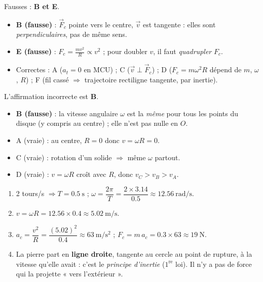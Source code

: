 \documentclass[11pt,a4paper]{article}
\newcommand{\vv}[1]{\vec{#1}}\newcommand{\ds}{\displaystyle}
\begin{document}

\begin{corrige}
Fausses : \textbf{B et E}.
\begin{itemize}[leftmargin=1.4em,topsep=2pt,itemsep=1.5pt]
  \item \textbf{B (fausse)} : $\vv F_c$ pointe vers le centre, $\vv v$ est tangente : elles sont \emph{perpendiculaires}, pas de même sens.
  \item \textbf{E (fausse)} : $F_c=\tfrac{mv^2}{R}\propto v^2$ ; pour doubler $v$, il faut \emph{quadrupler} $F_c$.
  \item Correctes : A ($a_t=0$ en MCU) ; C ($\vv v\perp\vv F_c$) ; D ($F_c=m\omega^2R$ dépend de $m$, $\omega$, $R$) ;
        F (fil cassé $\Rightarrow$ trajectoire rectiligne tangente, par inertie).
\end{itemize}
\end{corrige}

\begin{corrige}
L'affirmation incorrecte est \textbf{B}.
\begin{itemize}[leftmargin=1.4em,topsep=2pt,itemsep=1.5pt]
  \item \textbf{B (fausse)} : la vitesse angulaire $\omega$ est la \emph{même} pour tous les points du disque
        (y compris au centre) ; elle n'est pas nulle en $O$.
  \item A (vraie) : au centre, $R=0$ donc $v=\omega R=0$.
  \item C (vraie) : rotation d'un solide $\Rightarrow$ même $\omega$ partout.
  \item D (vraie) : $v=\omega R$ croît avec $R$, donc $v_C>v_B>v_A$.
\end{itemize}
\end{corrige}

\begin{corrige}
\begin{enumerate}[label=\alph*)]
  \item \num{2} tours/s $\Rightarrow T=\qty{0,5}{\second}$ ; $\omega=\dfrac{2\pi}{T}=\dfrac{2\times\num{3,14}}{\num{0,5}}\approx\qty{12,56}{\radian\per\second}$.
  \item $v=\omega R=\num{12,56}\times\num{0,4}\approx\qty{5,02}{\metre\per\second}$.
  \item $a_c=\dfrac{v^2}{R}=\dfrac{(\num{5,02})^2}{\num{0,4}}\approx\qty{63}{\metre\per\second\squared}$ ;
        $F_c=m\,a_c=\num{0,3}\times63\approx\qty{19}{\newton}$.
  \item La pierre part en \textbf{ligne droite}, tangente au cercle au point de rupture, à la vitesse
        qu'elle avait : c'est le \emph{principe d'inertie} ($1^{\text{re}}$ loi). Il n'y a pas de force qui la projette « vers l'extérieur ».
\end{enumerate}
\end{corrige}
\end{document}
